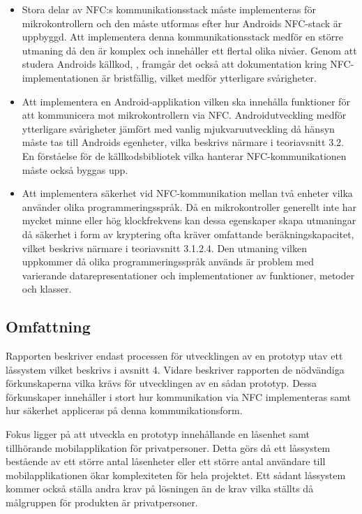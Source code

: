 \documentclass[11pt]{article}
\begin{document}
\begin{itemize}
\item Stora delar av NFC:s kommunikationsstack måste implementeras för mikrokontrollern och den måste utformas efter hur Androids NFC-stack är uppbyggd. Att implementera denna kommunikationsstack medför en större utmaning då den är komplex och innehåller ett flertal olika nivåer. Genom att studera Androids källkod, \textcite{online:Android_source_a}, framgår det också att dokumentation kring NFC-implementationen är bristfällig, vilket medför ytterligare svårigheter. 

\item Att implementera en Android-applikation vilken ska innehålla funktioner för att kommunicera mot mikrokontrollern via NFC. Androidutveckling medför ytterligare svårigheter jämfört med vanlig mjukvaruutveckling då hänsyn måste tas till Androids egenheter, vilka beskrivs närmare i teoriavsnitt 3.2. En förståelse för de källkodsbibliotek vilka hanterar NFC-kommunikationen måste också byggas upp.

\item Att implementera säkerhet vid NFC-kommunikation mellan två enheter vilka använder olika programmeringsspråk. Då en mikrokontroller generellt inte har mycket minne eller hög klockfrekvens kan dessa egenskaper skapa utmaningar då säkerhet i form av kryptering ofta kräver omfattande beräkningskapacitet, vilket beskrivs närmare i teoriavsnitt 3.1.2.4. Den utmaning vilken uppkommer då olika programmeringsspråk används är problem med varierande datarepresentationer och implementationer av funktioner, metoder och klasser.
\end{itemize}

\subsection{Omfattning}
\label{Omfattning}
Rapporten beskriver endast processen för utvecklingen av en prototyp utav ett låssystem vilket beskrivs i avsnitt 4. Vidare beskriver rapporten de nödvändiga förkunskaperna vilka krävs för utvecklingen av en sådan prototyp. Dessa förkunskaper innehåller i stort hur kommunikation via NFC implementeras samt hur säkerhet appliceras på denna kommunikationsform.

Fokus ligger på att utveckla en prototyp innehållande en låsenhet samt tillhörande mobilapplikation för privatpersoner. Detta görs då ett låssystem bestående av ett större antal låsenheter eller ett större antal användare till mobilapplikationen ökar komplexiteten för hela projektet. Ett sådant låssystem kommer också ställa andra krav på lösningen än de krav vilka ställts då målgruppen för produkten är privatpersoner.
\end{document}
